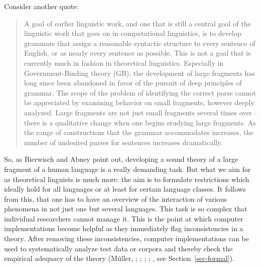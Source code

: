 Consider another quote:
\begin{quote}
A goal of earlier linguistic work, and one that is still a central goal of the
linguistic work that goes on in computational linguistics, is to develop grammars
that assign a reasonable syntactic structure to every sentence of English,
or as nearly every sentence as possible. This is not a goal that is currently much
in fashion in theoretical linguistics. Especially in Government-Binding theory
(GB), the development of large fragments has long since been abandoned in
favor of the pursuit of deep principles of grammar.
The scope of the problem of identifying the correct parse cannot be appreciated
by examining behavior on small fragments, however deeply analyzed.
Large fragments are not just small fragments several times over\,--\,there is a
qualitative change when one begins studying large fragments. As the range of
constructions that the grammar accommodates increases, the number of undesired parses for sentences
increases dramatically. \citep[]{Abney96a}
\end{quote}
%
So, as Bierwisch and Abney point out, developing a sound theory of a large fragment of a human
language is a really demanding task. But what we aim for as theoretical linguists is much more: the aim is to formulate restrictions which ideally hold for all languages or at least
for certain language classes. It follows from this, that one has to have an overview of the interaction of various phenomena in
not just one but several languages. This task is so complex that individual researchers cannot manage it. This is
the point at which computer implementations become helpful as they immediately flag inconsistencies in a theory. 
After removing these inconsistencies, computer implementations can be used to systematically analyze test data
or corpora and thereby check the empirical adequacy of the theory
(Müller, \citeyear[Chapter~22]{Mueller99a}; \citeyear{MuellerCoreGram}; \citeyear{MuellerKernigkeit}; \citealp{OF98}; \citealp{Bender2008c}, see Section~\ref{sec-formal}).

